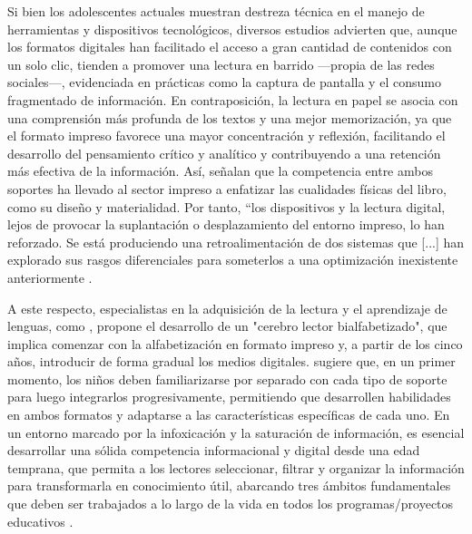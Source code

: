 \documentclass[spanish]{textolivre}
\begin{document}
Si bien los adolescentes actuales muestran destreza técnica en el manejo de herramientas y dispositivos tecnológicos, diversos estudios \cite{cruces_como_2017,kovac_lectura_2020} advierten que, aunque los formatos digitales han facilitado el acceso a gran cantidad de contenidos con un solo clic, tienden a promover una lectura en barrido —propia de las redes sociales—, evidenciada en prácticas como la captura de pantalla y el consumo fragmentado de información. En contraposición, la lectura en papel se asocia con una comprensión más profunda de los textos y una mejor memorización, ya que el formato impreso favorece una mayor concentración y reflexión, facilitando el desarrollo del pensamiento crítico y analítico y contribuyendo a una retención más efectiva de la información. Así, \textcite{cordon-garcia_combates_2018,stole_mito_2020} señalan que la competencia entre ambos soportes ha llevado al sector impreso a enfatizar las cualidades físicas del libro, como su diseño y materialidad. Por tanto, “los dispositivos y la lectura digital, lejos de provocar la suplantación o desplazamiento del entorno impreso, lo han reforzado. Se está produciendo una retroalimentación de dos sistemas que [...] han explorado sus rasgos diferenciales para someterlos a una optimización inexistente anteriormente \cite[p. 477]{cordon-garcia_combates_2018}.

A este respecto, especialistas en la adquisición de la lectura y el aprendizaje de lenguas, como \textcite[p. 204]{wolf_lector_2020}, propone el desarrollo de un "cerebro lector bialfabetizado", que implica comenzar con la alfabetización en formato impreso y, a partir de los cinco años, introducir de forma gradual los medios digitales. \textcite{wolf_lector_2020} sugiere que, en un primer momento, los niños deben familiarizarse por separado con cada tipo de soporte para luego integrarlos progresivamente, permitiendo que desarrollen habilidades en ambos formatos y adaptarse a las características específicas de cada uno. En un entorno marcado por la infoxicación y la saturación de información, es esencial desarrollar una sólida competencia informacional y digital desde una edad temprana, que permita a los lectores seleccionar, filtrar y organizar la información para transformarla en conocimiento útil, abarcando tres ámbitos fundamentales que deben ser trabajados a lo largo de la vida en todos los programas/proyectos educativos \cite[p. 65-66]{area_alfabetizacion_2012}.
\end{document}
